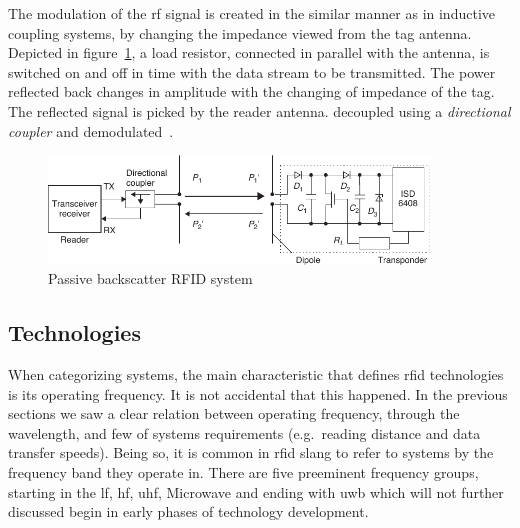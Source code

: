 The modulation of the \ac{rf} signal is created in the similar manner as in inductive coupling systems, by changing the impedance viewed from the tag antenna. 
Depicted in figure~\ref{fig:backscatter}, a load resistor, connected in parallel with the antenna, is switched on and off in time with the data stream to be transmitted.
The power reflected back changes in amplitude with the changing of impedance of the tag.
The reflected signal is picked by the reader antenna. decoupled using a \emph{directional coupler} and demodulated~\cite{finkenzellerRFIDHandbookFundamentals2003, RFIDCouplingTechniques}.

\begin{figure}[!ht]
    \centering
    \includegraphics[width=0.9\textwidth]{./figs/02-state-of-the-art/backscatter.pdf}
    \caption{Passive backscatter RFID system~\cite{finkenzellerRFIDHandbookFundamentals2003}} 
    \label{fig:backscatter}
\end{figure}

\subsection{Technologies} \label{sec:opfrequency}

When categorizing systems, the main characteristic that defines \ac{rfid} technologies is its operating frequency.
It is not accidental that this happened. In the previous sections we saw a clear relation between operating frequency, through the wavelength, and few of systems requirements (e.g.\ reading distance and data transfer speeds).
Being so, it is common in \ac{rfid} slang to refer to systems by the frequency band they operate in.
There are five preeminent frequency groups, starting in the \ac{lf}, \ac{hf}, \ac{uhf}, Microwave and ending with \ac{uwb} which will not further discussed begin in early phases of technology development.






